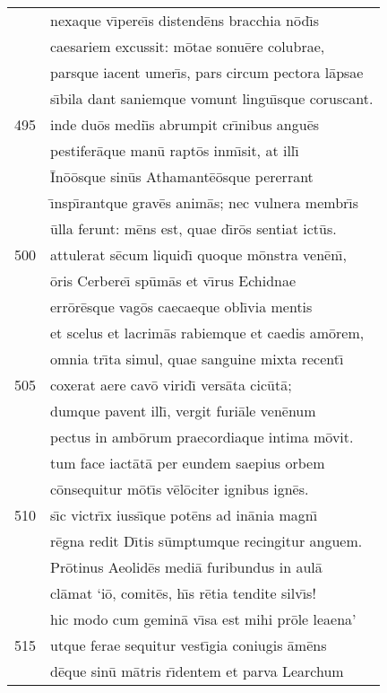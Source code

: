 \documentclass[paper=6in:9in,pagesize=pdftex,
               headinclude=on,footinclude=on,12pt]{scrbook}
\begin{document}
\begin{longtable}[p]{ r l }
 & nexaque v\={\i}pere\={\i}s distend\=ens bracchia n\=od\={\i}s\\ 
 & caesariem excussit: m\=otae sonu\=ere colubrae,\\ 
 & parsque iacent umer\={\i}s, pars circum pectora l\=apsae\\ 
 & s\={\i}bila dant saniemque vomunt lingu\={\i}sque coruscant.\\ 
495 & inde du\=os medi\={\i}s abrumpit cr\={\i}nibus angu\=es\\ 
 & pestifer\=aque man\=u rapt\=os inm\={\i}sit, at ill\={\i}\\ 
 & \=In\=o\=osque sin\=us Athamant\=e\=osque pererrant\\ 
 & \={\i}nsp\={\i}rantque grav\=es anim\=as; nec vulnera membr\={\i}s\\ 
 & \=ulla ferunt: m\=ens est, quae d\={\i}r\=os sentiat ict\=us.\\ 
500 & attulerat s\=ecum liquid\={\i} quoque m\=onstra ven\=en\={\i},\\ 
 & \=oris Cerbere\={\i} sp\=um\=as et v\={\i}rus Echidnae\\ 
 & err\=or\=esque vag\=os caecaeque obl\={\i}via mentis\\ 
 & et scelus et lacrim\=as rabiemque et caedis am\=orem,\\ 
 & omnia tr\={\i}ta simul, quae sanguine mixta recent\={\i}\\ 
505 & coxerat aere cav\=o virid\={\i} vers\=ata cic\=ut\=a;\\ 
 & dumque pavent ill\={\i}, vergit furi\=ale ven\=enum\\ 
 & pectus in amb\=orum praecordiaque intima m\=ovit.\\ 
 & tum face iact\=at\=a per eundem saepius orbem\\ 
 & c\=onsequitur m\=ot\={\i}s v\=el\=ociter ignibus ign\=es.\\ 
510 & s\={\i}c victr\={\i}x iuss\={\i}que pot\=ens ad in\=ania magn\={\i}\\ 
 & r\=egna redit D\={\i}tis s\=umptumque recingitur anguem.\\ 
 & \indent Pr\=otinus Aeolid\=es medi\=a furibundus in aul\=a\\ 
 & cl\=amat `i\=o, comit\=es, h\={\i}s r\=etia tendite silv\={\i}s!\\ 
 & hic modo cum gemin\=a v\={\i}sa est mihi pr\=ole leaena'\\ 
515 & utque ferae sequitur vest\={\i}gia coniugis \=am\=ens\\ 
 & d\=eque sin\=u m\=atris r\={\i}dentem et parva Learchum\\ 

\end{longtable}
\end{document}
